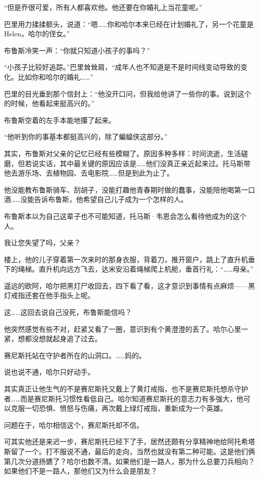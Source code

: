 \documentclass[../main]{subfiles}
\begin{document}
“但是乔很可爱，所有人都喜欢他。他还要在你婚礼上当花童呢。”

巴里用力揉揉额头，说道：“嗯……你和哈尔本来已经在计划婚礼了，另一个花童是Helen，哈尔的侄女。”

布鲁斯冷笑一声：“你就只知道小孩子的事吗？”

“小孩子比较好追踪。”巴里耸耸肩，“成年人也不知道是不是时间线变动导致的变化。比如你和哈尔的婚礼\ldots\ldots”

巴里的目光垂到那个信封上：“他没开口问，但我给他讲了一些你的事。说到这个的时候，他看起来挺高兴的。”

布鲁斯空着的左手本能地攥了起来。

“他听到你的事基本都挺高兴的，除了蝙蝠侠这部分。”

其实，布鲁斯对父亲的记忆已经有些模糊了。原因多种多样：时间流逝，生活磋磨，但若说实话，其中最关键的原因应该是……他们没真正亲近起来过。托马斯带他去游乐场、去植物园、去电影院……但是到此为止了。

他没能教布鲁斯骑车、刮胡子，没能打趣他青春期时做的蠢事，没能陪他喝第一口酒……没能告诉布鲁斯，他希望自己儿子成为一个怎样的人。

布鲁斯本以为自己这辈子也不可能知道，托马斯·韦恩会怎么看待他成为的这个人。

我让您失望了吗，父亲？

楼上，他的儿子穿着第一次来时的那身衣服，背着刀，推开窗户，跳上了直升机垂下的绳梯。直升机向远方飞去，达米安沿着绳梯爬上机舱，垂首行礼：“……母亲。”

遥远的欧阿，哈尔把黑灯尸收回去，四下看了看，这才意识到事情有点麻烦——黑灯戒指还套在他手指头上呢。

这……这回去说自己没死，布鲁斯能信吗？

他突然感觉有些不对，赶紧又看了一圈，意识到有个黄澄澄的丢了。哈尔心里一紧，想都没想就起身追了过去。

赛尼斯托站在守护者所在的山洞口。……妈的。

说也说不通，哈尔只好动手。

其实真正让他生气的不是赛尼斯托又戴上了黄灯戒指，也不是赛尼斯托想杀守护者……而是赛尼斯托习惯性看低自己。哈尔知道赛尼斯托的意志力有多强大，他可以克服一切恐惧、愤怒与伤痛，再次戴上绿灯戒指，重新成为一个英雄。

问题在于，哈尔相信这个，赛尼斯托却不信。

可其实他还是来迟一步，赛尼斯托已经下了手，居然还颇有分享精神地给阿托希塔斯留了一个。打不服说不通，最后的走向，当然也就没有第二种可能。这是他们俩第几次分道扬镳了？哈尔也数不清。如果他们是一路人，那为什么总要刀兵相向？如果他们不是一路人，那他们又为什么会是朋友？
\end{document}
